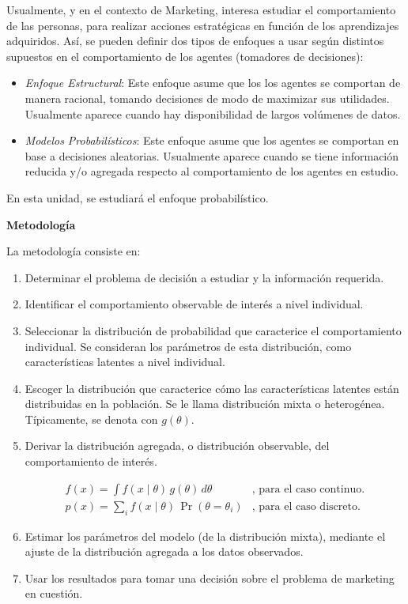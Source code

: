 \documentclass[
]{book}
\begin{document}
Usualmente, y en el contexto de Marketing, interesa estudiar el
comportamiento de las personas, para realizar acciones estratégicas en
función de los aprendizajes adquiridos. Así, se pueden definir dos tipos
de enfoques a usar según distintos supuestos en el comportamiento de los
agentes (tomadores de decisiones):

\begin{itemize}
\item
  \emph{Enfoque Estructural}: Este enfoque asume que los los agentes se
  comportan de manera racional, tomando decisiones de modo de
  maximizar sus utilidades. Usualmente aparece cuando hay
  disponibilidad de largos volúmenes de datos.
\item
  \emph{Modelos Probabilísticos}: Este enfoque asume que los agentes se
  comportan en base a decisiones aleatorias. Usualmente aparece cuando
  se tiene información reducida y/o agregada respecto al
  comportamiento de los agentes en estudio.
\end{itemize}

En esta unidad, se estudiará el enfoque probabilístico.

\textbf{Metodología}

La metodología consiste en:

\begin{enumerate}
\def\labelenumi{\arabic{enumi}.}
\item
  Determinar el problema de decisión a estudiar y la información
  requerida.
\item
  Identificar el comportamiento observable de interés a nivel
  individual.
\item
  Seleccionar la distribución de probabilidad que caracterice el
  comportamiento individual. Se consideran los parámetros de esta
  distribución, como características latentes a nivel individual.
\item
  Escoger la distribución que caracterice cómo las características
  latentes están distribuidas en la población. Se le llama
  distribución mixta o heterogénea. Típicamente, se denota con
  \(g(\theta)\).
\item
  Derivar la distribución agregada, o distribución observable, del
  comportamiento de interés.

  \[
  \begin{array}{cc}
  f(x) = \int f(x \mid \theta)\, g(\theta)\, d\theta & \text{, para el caso continuo.} \\
  p(x) = \sum_{i}f(x \mid \theta)\, \Pr(\theta = \theta_{i}) & \text{, para el caso discreto.}
  \end{array}
  \]
\item
  Estimar los parámetros del modelo (de la distribución mixta),
  mediante el ajuste de la distribución agregada a los datos
  observados.
\item
  Usar los resultados para tomar una decisión sobre el problema de
  marketing en cuestión.
\end{enumerate}
\end{document}

